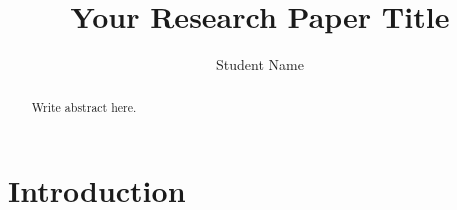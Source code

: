 \documentclass[conference]{IEEEtran}
\begin{document}
\title{Your Research Paper Title}
\author{Student Name}
\maketitle
\begin{abstract}
Write abstract here.
\end{abstract}
\section{Introduction}
\end{document}
